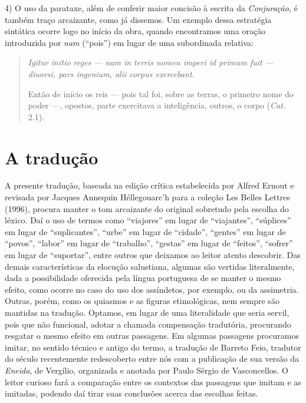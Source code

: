 4) O uso da parataxe, além de conferir maior concisão à escrita da \emph{Conjuração},
é também traço arcaizante, como já dissemos. Um exemplo dessa estratégia
sintática ocorre logo no início da obra, quando encontramos uma oração
introduzida por \emph{nam} (“pois”) em lugar de uma subordinada relativa:
\begin{quote} \emph{Igitur initio reges --- nam in terris nomen imperi id primum
  fuit --- diuorsi, pars ingenium, alii corpus exercebant.}

Então de início os reis --- pois tal foi, sobre as terras, o primeiro nome do
poder ---, opostos, parte exercitava a inteligência, outros, o corpo (\emph{Cat.} 2.1).
\end{quote}



\section{A tradução}

 A presente tradução, baseada na edição crítica estabelecida por Alfred Ernout e revisada por Jacques Annequin Héllegouarc'h para a coleção
 Les Belles Lettres (1996), procura manter o tom arcaizante do original
 sobretudo pela escolha do léxico. Daí o uso de termos como “viajores” em lugar
 de “viajantes”, “súplices” em lugar de “suplicantes”, “urbe” em lugar de
 “cidade”, “gentes” em lugar de “povos”, “labor” em lugar de “trabalho”,
 “gestas” em lugar de “feitos”, “sofrer” em lugar de “suportar”, entre outros
 que deixamos ao leitor atento descobrir.  Das demais características da
 elocução salustiana, algumas são vertidas literalmente, dada a possibilidade
 oferecida pela língua portuguesa de se manter o mesmo efeito, como ocorre no
 caso do uso dos assíndetos, por exemplo, ou da assimetria. Outras, porém, como os quiasmos e as figuras
 etimológicas, nem sempre são mantidas na tradução. Optamos, em lugar de uma
 literalidade que seria servil, pois que não funcional, adotar a chamada
 compensação tradutória, procurando resgatar o mesmo efeito em outras
 passagens.  Em algumas passagens procuramos imitar, no sentido técnico
 e antigo do termo, a tradução de Barreto Feio, tradutor do século 
 recentemente redescoberto entre nós com a publicação de sua versão da \emph{Eneida},
 de Vergílio, organizada e anotada por Paulo Sérgio de Vasconcellos. O leitor
 curioso fará a comparação entre os contextos das passagens que imitam e as
 imitadas, podendo daí tirar suas conclusões acerca das escolhas feitas. 

